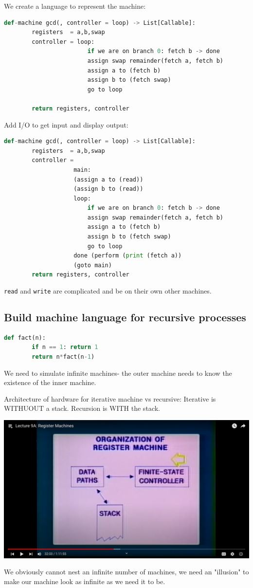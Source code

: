 \documentclass[a4paper,twoside]{article}
\numberwithin{equation}{section}
\begin{document}
We create a language to represent the machine:
\begin{lstlisting}[language = Python]
    def-machine gcd(, controller = loop) -> List[Callable]:
        registers  = a,b,swap
        controller = loop:
                        if we are on branch 0: fetch b -> done
                        assign swap remainder(fetch a, fetch b)
                        assign a to (fetch b)
                        assign b to (fetch swap)
                        go to loop

        return registers, controller
\end{lstlisting}
Add I/O to get input and display output:
\begin{lstlisting}[language = Python]
    def-machine gcd(, controller = loop) -> List[Callable]:
        registers  = a,b,swap
        controller =
                    main:
                    (assign a to (read))
                    (assign b to (read))
                    loop:
                        if we are on branch 0: fetch b -> done
                        assign swap remainder(fetch a, fetch b)
                        assign a to (fetch b)
                        assign b to (fetch swap)
                        go to loop
                    done (perform (print (fetch a))
                    (goto main)
        return registers, controller
\end{lstlisting}
\texttt{read} and \texttt{write} are complicated and be on their own other machines.

\subsection{Build machine language for recursive processes}
\begin{lstlisting}[language = Python]
    def fact(n):
        if n == 1: return 1
        return n*fact(n-1)
\end{lstlisting}
We need to simulate infinite machines- the outer machine needs to know the existence of the inner machine.

Architecture of hardware for iterative machine vs recursive:
Iterative is WITHUOUT a stack.
Recursion is WITH the stack.

\begin{center}
    \includegraphics[scale = 0.2]{assets/iterative_machine.png}
\end{center}
We obviously cannot nest an infinite number of machines, we need an "illusion" to make our machine
look as infinite as we need it to be.
\end{document}
